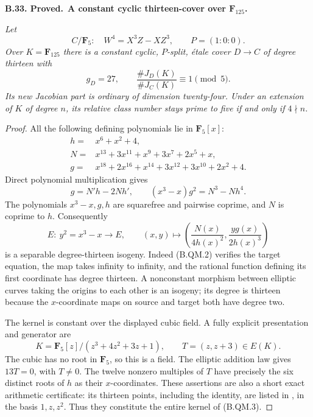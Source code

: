 \documentclass[11pt,a4paper]{article}
\newenvironment{claim}[3]{\par\medskip\noindent\hypertarget{#1}{\textbf{#1. #2.}}\ \textbf{#3.}\par\nopagebreak\smallskip\begingroup\itshape}{\endgroup\par\smallskip}
\begin{document}
\begin{claim}{B.33}{Proved}{A constant cyclic thirteen-cover over \(\mathbf F_{125}\)}
Let
\[
 C/\mathbf F_5:\quad W^4=X^3Z-XZ^3,\qquad P=(1:0:0).
\]
Over $K=\mathbf F_{125}$ there is a constant cyclic, $P$-split,
\emph{\'etale} cover $D\to C$ of degree thirteen with
\[
  g_D=27,\qquad
  \frac{\#J_D(K)}{\#J_C(K)}\equiv1\pmod5.
\]
Its new Jacobian part is ordinary of dimension twenty-four.
Under an extension of $K$ of degree $n$, its relative class
number stays prime to five if and only if $4\nmid n$.
\end{claim}
\begin{proof}
All the following defining polynomials lie in $\mathbf F_5[x]$:
\[
\begin{split}
 h={}&x^6+x^2+4,\\
 N={}&x^{13}+3x^{11}+x^9+3x^7+2x^5+x,\\
 g={}&x^{18}+2x^{16}+x^{14}+3x^{12}+3x^{10}+2x^2+4.
\end{split}                                                    \tag{B.QM.1}
\]
Direct polynomial multiplication gives
\[
 g=N'h-2Nh',\qquad
       (x^3-x)g^2=N^3-Nh^4.                                    \tag{B.QM.2}
\]
The polynomials $x^3-x,g,h$ are squarefree and pairwise coprime,
and $N$ is coprime to $h$. Consequently
\[
 E:\ y^2=x^3-x\longrightarrow E,\qquad
       (x,y)\longmapsto
       \left(\frac{N(x)}{4h(x)^2},\frac{y g(x)}{2h(x)^3}\right)
                                                                  \tag{B.QM.3}
\]
is a separable degree-thirteen isogeny. Indeed (B.QM.2) verifies
the target equation, the map takes infinity to infinity, and
the rational function defining its first coordinate has degree
thirteen. A nonconstant morphism between elliptic curves taking
the origins to each other is an isogeny; its degree is thirteen
because the $x$-coordinate maps on source and target both have
degree two.

The kernel is constant over the displayed cubic field. A fully
explicit presentation and generator are
\[
 K=\mathbf F_5[z]/(z^3+4z^2+3z+1),\qquad
                    T=(z,z+3)\in E(K).                           \tag{B.QM.4}
\]
The cubic has no root in $\mathbf F_5$, so this is a field.
The elliptic addition law gives $13T=0$, with $T\ne0$.
The twelve nonzero multiples of $T$ have precisely the six
distinct roots of $h$ as their $x$-coordinates. These assertions
are also a short exact arithmetic certificate: its thirteen
points, including the identity, are listed in
, in the basis
$1,z,z^2$. Thus they constitute the entire kernel of (B.QM.3).


\end{proof}
\end{document}
